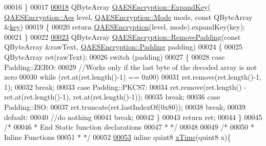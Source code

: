 \begin{DoxyCode}
00016 \}
00017 
\hypertarget{qaesencryption_8cpp_source.tex_l00018}{}\hyperlink{class_q_a_e_s_encryption_a2112456e057e6dd886694348fbf202cd}{00018} QByteArray \hyperlink{class_q_a_e_s_encryption_a2112456e057e6dd886694348fbf202cd}{QAESEncryption::ExpandKey}(
      \hyperlink{class_q_a_e_s_encryption_abe48208f4f6c7d68e6a10b49b9d0b7bd}{QAESEncryption::Aes} level, \hyperlink{class_q_a_e_s_encryption_ad3e031c49a3d56566379d75b40b7b255}{QAESEncryption::Mode} mode, \textcolor{keyword}{const} 
      QByteArray &\hyperlink{namespace_errors_dict_setup_a09c268098d09ffb8e5504f30fa6d5dd9}{key})
00019 \{
00020      \textcolor{keywordflow}{return} \hyperlink{class_q_a_e_s_encryption_aeac0ee8532e69e5d30b023fe38c30b3b}{QAESEncryption}(level, mode).expandKey(key);
00021 \}
00022 
\hypertarget{qaesencryption_8cpp_source.tex_l00023}{}\hyperlink{class_q_a_e_s_encryption_abb2887bf5623a74053dd19627f3d3055}{00023} QByteArray \hyperlink{class_q_a_e_s_encryption_abb2887bf5623a74053dd19627f3d3055}{QAESEncryption::RemovePadding}(\textcolor{keyword}{const} QByteArray &rawText, 
      \hyperlink{class_q_a_e_s_encryption_ab0a65cdea4eac21ef32530010d1b0247}{QAESEncryption::Padding} padding)
00024 \{
00025     QByteArray ret(rawText);
00026     \textcolor{keywordflow}{switch} (padding)
00027     \{
00028     \textcolor{keywordflow}{case} Padding::ZERO:
00029         \textcolor{comment}{//Works only if the last byte of the decoded array is not zero}
00030         \textcolor{keywordflow}{while} (ret.at(ret.length()-1) == 0x00)
00031             ret.remove(ret.length()-1, 1);
00032         \textcolor{keywordflow}{break};
00033     \textcolor{keywordflow}{case} Padding::PKCS7:
00034         ret.remove(ret.length() - ret.at(ret.length()-1), ret.at(ret.length()-1));
00035         \textcolor{keywordflow}{break};
00036     \textcolor{keywordflow}{case} Padding::ISO:
00037         ret.truncate(ret.lastIndexOf(0x80));
00038         \textcolor{keywordflow}{break};
00039     \textcolor{keywordflow}{default}:
00040         \textcolor{comment}{//do nothing}
00041         \textcolor{keywordflow}{break};
00042     \}
00043     \textcolor{keywordflow}{return} ret;
00044 \}
00045 \textcolor{comment}{/*}
00046 \textcolor{comment}{ * End Static function declarations}
00047 \textcolor{comment}{ * */}
00048 
00049 \textcolor{comment}{/*}
00050 \textcolor{comment}{ * Inline Functions}
00051 \textcolor{comment}{ * */}
00052 
\hypertarget{qaesencryption_8cpp_source.tex_l00053}{}\hyperlink{qaesencryption_8cpp_a94a5c6f286db021d028ddc6f91a65f72}{00053} \textcolor{keyword}{inline} quint8 \hyperlink{qaesencryption_8cpp_a94a5c6f286db021d028ddc6f91a65f72}{xTime}(quint8 x)\{

\end{DoxyCode}
